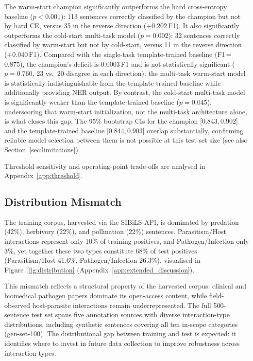 \documentclass[11pt,twocolumn]{article}
\begin{document}
The warm-start champion significantly outperforms the hard cross-entropy
baseline ($p{<}0.001$): 113 sentences correctly classified by the champion
but not by hard CE, versus 35 in the reverse direction (+0.202\,F1).
It also significantly outperforms the cold-start multi-task model
($p{=}0.002$): 32 sentences correctly classified by warm-start
but not by cold-start, versus 11 in the reverse direction (+0.040\,F1).
Compared with the single-task template-trained baseline (F1\,=\,0.875),
the champion's deficit is 0.0003\,F1 and is not statistically significant
($p = 0.760$, 23 vs.\ 20 disagree in each direction): the multi-task warm-start model
is statistically indistinguishable from the template-trained baseline while
additionally providing NER output. By contrast, the cold-start multi-task
model is significantly weaker than the template-trained baseline
($p{=}0.045$), underscoring that warm-start initialization, not the
multi-task architecture alone, is what closes this gap.
The 95\% bootstrap CIs for the champion [$0.843, 0.902$] and the
template-trained baseline [$0.844, 0.903$] overlap substantially, confirming
reliable model selection between them is not possible at this test set size
(see also Section~\ref{sec:limitations}).

Threshold sensitivity and operating-point trade-offs are analysed in
Appendix~\ref{app:threshold}.

\subsection{Distribution Mismatch}

The training corpus, harvested via the SIBiLS API,
is dominated by predation (42\%), herbivory (22\%), and pollination (22\%)
sentences.
Parasitism/Host interactions represent only 10\% of training positives, and
Pathogen/Infection only 3\%, yet together these two types constitute 68\%
of test positives (Parasitism/Host 41.6\%, Pathogen/Infection 26.3\%),
visualised in Figure~\ref{fig:distribution} (Appendix~\ref{app:extended_discussion}).

This mismatch reflects a structural property of the harvested corpus:
clinical and biomedical pathogen papers dominate its open-access content,
while field-observed host-parasite interactions remain underrepresented.
The full 500-sentence test set spans five annotation sources
with diverse interaction-type distributions, including synthetic sentences
covering all ten in-scope categories (gen-set-100). The distributional gap
between training and test is expected: it identifies where to invest in
future data collection to improve robustness across interaction types.
\end{document}
